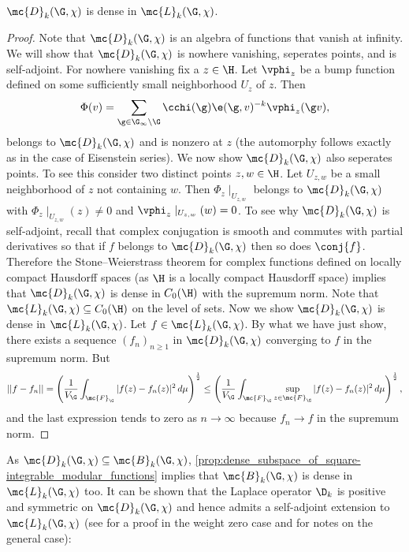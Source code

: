     \begin{proposition}\label{prop:dense_subspace_of_square-integrable_modular_functions}
      $\mc{D}_{k}(\G,\chi)$ is dense in $\mc{L}_{k}(\G,\chi)$.
    \end{proposition}
    \begin{proof}
      Note that $\mc{D}_{k}(\G,\chi)$ is an algebra of functions that vanish at infinity. We will show that $\mc{D}_{k}(\G,\chi)$ is nowhere vanishing, seperates points, and is self-adjoint. For nowhere vanishing fix a $z \in \H$. Let $\vphi_{z}$ be a bump function defined on some sufficiently small neighborhood $U_{z}$ of $z$. Then
      \[
        \Phi(v) = \sum_{\g \in \G_{\infty}\backslash\G}\cchi(\g)\e(\g,v)^{-k}\vphi_{z}(\g v),
      \]
      belongs to $\mc{D}_{k}(\G,\chi)$ and is nonzero at $z$ (the automorphy follows exactly as in the case of Eisenstein series). We now show $\mc{D}_{k}(\G,\chi)$ also seperates points. To see this consider two distinct points $z,w \in \H$. Let $U_{z,w}$ be a small neighborhood of $z$ not containing $w$. Then $\Phi_{z}\mid_{U_{z,w}}$ belongs to $\mc{D}_{k}(\G,\chi)$ with $\Phi_{z}\mid_{U_{z,w}}(z) \neq 0$ and $\vphi_{z}\mid_{U_{z,w}}(w) = 0$. To see why $\mc{D}_{k}(\G,\chi)$ is self-adjoint, recall that complex conjugation is smooth and commutes with partial derivatives so that if $f$ belongs to $\mc{D}_{k}(\G,\chi)$ then so does $\conj{f}$. Therefore the Stone–Weierstrass theorem for complex functions defined on locally compact Hausdorff spaces (as $\H$ is a locally compact Hausdorff space) implies that $\mc{D}_{k}(\G,\chi)$ is dense in $C_{0}(\H)$ with the supremum norm. Note that $\mc{L}_{k}(\G,\chi) \subseteq C_{0}(\H)$ on the level of sets. Now we show $\mc{D}_{k}(\G,\chi)$ is dense in $\mc{L}_{k}(\G,\chi)$. Let $f \in \mc{L}_{k}(\G,\chi)$. By what we have just show, there exists a sequence $(f_{n})_{n \ge 1}$ in $\mc{D}_{k}(\G,\chi)$ converging to $f$ in the supremum norm. But 
      \[
        ||f-f_{n}|| = \left(\frac{1}{V_{\G}}\int_{\mc{F}_{\G}}|f(z)-f_{n}(z)|^{2}\,d\mu\right)^{\frac{1}{2}} \le \left(\frac{1}{V_{\G}}\int_{\mc{F}_{\G}}\sup_{z \in \mc{F}_{\G}}|f(z)-f_{n}(z)|^{2}\,d\mu\right)^{\frac{1}{2}},
      \]
      and the last expression tends to zero as $n \to \infty$ because $f_{n} \to f$ in the supremum norm.
    \end{proof}

    As $\mc{D}_{k}(\G,\chi) \subseteq \mc{B}_{k}(\G,\chi)$, \cref{prop:dense_subspace_of_square-integrable_modular_functions} implies that $\mc{B}_{k}(\G,\chi)$ is dense in $\mc{L}_{k}(\G,\chi)$ too. It can be shown that the Laplace operator $\D_{k}$ is positive and symmetric on $\mc{D}_{k}(\G,\chi)$ and hence admits a self-adjoint extension to $\mc{L}_{k}(\G,\chi)$ (see \cite{iwaniec2002spectral} for a proof in the weight zero case and \cite{cohenmodular2017} for notes on the general case):

